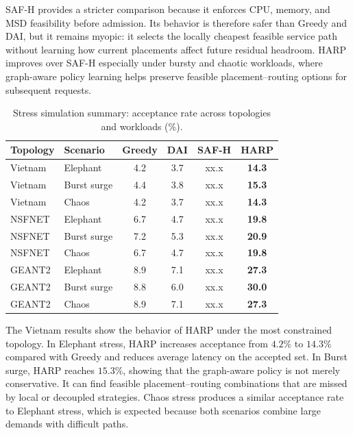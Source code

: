 \documentclass[final,5p]{elsarticle}
\begin{document}
SAF-H provides a stricter comparison because it enforces CPU, memory, and MSD feasibility before admission. Its behavior is therefore safer than Greedy and DAI, but it remains myopic: it selects the locally cheapest feasible service path without learning how current placements affect future residual headroom. HARP improves over SAF-H especially under bursty and chaotic workloads, where graph-aware policy learning helps preserve feasible placement--routing options for subsequent requests.

\begin{table}[t]
\centering
\caption{Stress simulation summary: acceptance rate across topologies and workloads (\%).}
\label{tab:simulation_acceptance_summary}
\renewcommand{\arraystretch}{1.15}
\small
\begin{tabular}{llcccc}
\toprule
\textbf{Topology} & \textbf{Scenario} & \textbf{Greedy} & \textbf{DAI} & \textbf{SAF-H} & \textbf{HARP} \\
\midrule
Vietnam & Elephant & 4.2 & 3.7 & xx.x & \textbf{14.3} \\
Vietnam & Burst surge & 4.4 & 3.8 & xx.x & \textbf{15.3} \\
Vietnam & Chaos & 4.2 & 3.7 & xx.x &  \textbf{14.3} \\
NSFNET & Elephant & 6.7 & 4.7 & xx.x &  \textbf{19.8} \\
NSFNET & Burst surge & 7.2 & 5.3 & xx.x &  \textbf{20.9} \\
NSFNET & Chaos & 6.7 & 4.7 & xx.x &  \textbf{19.8} \\
GEANT2 & Elephant & 8.9 & 7.1 & xx.x &  \textbf{27.3} \\
GEANT2 & Burst surge & 8.8 & 6.0 & xx.x &  \textbf{30.0} \\
GEANT2 & Chaos & 8.9 & 7.1 & xx.x &  \textbf{27.3} \\
\bottomrule
\end{tabular}
\end{table}

The Vietnam results show the behavior of HARP under the most constrained topology. In Elephant stress, HARP increases acceptance from \(4.2\%\) to \(14.3\%\) compared with Greedy and reduces average latency on the accepted set. In Burst surge, HARP reaches \(15.3\%\), showing that the graph-aware policy is not merely conservative. It can find feasible placement--routing combinations that are missed by local or decoupled strategies. Chaos stress produces a similar acceptance rate to Elephant stress, which is expected because both scenarios combine large demands with difficult paths.
\end{document}
